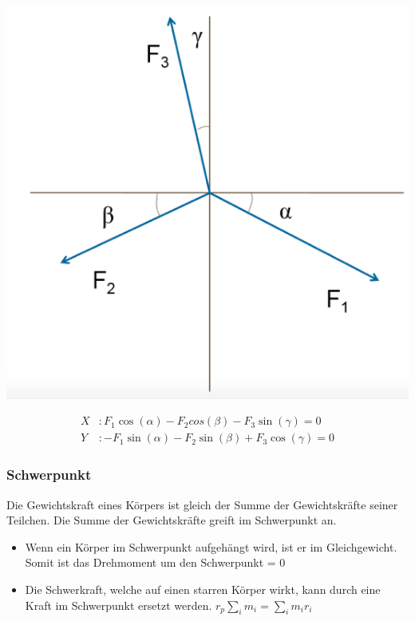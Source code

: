 \begin{minipage}[h!]{0.5\linewidth}
	\includegraphics[width=0.7\linewidth]{images/gleichgewicht}
\end{minipage}
\hfill
\begin{minipage}[h!]{0.5\linewidth}
	
	\begin{align*}
	X &: F_1  \cos(\alpha) - F_2  cos(\beta) - F_3 \sin(\gamma) = 0 \\
	Y &: -F_1  \sin(\alpha) - F_2 \sin(\beta) + F_3 \cos(\gamma) = 0
	\end{align*}
	
\end{minipage}

\subsubsection{Schwerpunkt}
Die Gewichtskraft eines Körpers ist gleich der Summe der Gewichtskräfte seiner Teilchen. Die Summe der Gewichtskräfte greift im Schwerpunkt an.

\begin{itemize}
	\item Wenn ein Körper im Schwerpunkt aufgehängt wird, ist er im Gleichgewicht. Somit ist das Drehmoment um den Schwerpunkt = 0
	\item Die Schwerkraft, welche auf einen starren Körper wirkt, kann durch eine Kraft im Schwerpunkt ersetzt werden. $r_p \sum_{i} m_i = \sum_{i} m_i  r_i$
\end{itemize}
